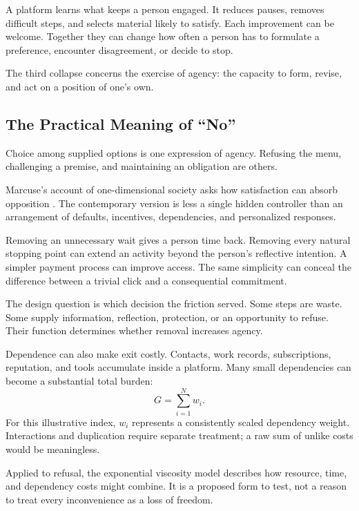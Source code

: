 \documentclass[11pt,openany]{book}
\begin{document}
A platform learns what keeps a person engaged. It reduces pauses, removes difficult steps, and selects material likely to satisfy. Each improvement can be welcome. Together they can change how often a person has to formulate a preference, encounter disagreement, or decide to stop.

The third collapse concerns the exercise of agency: the capacity to form, revise, and act on a position of one's own.

\subsection{The Practical Meaning of “No”}

Choice among supplied options is one expression of agency. Refusing the menu, challenging a premise, and maintaining an obligation are others.

Marcuse's account of one-dimensional society asks how satisfaction can absorb opposition \cite{marcuse1964onedimensional}. The contemporary version is less a single hidden controller than an arrangement of defaults, incentives, dependencies, and personalized responses.

Removing an unnecessary wait gives a person time back. Removing every natural stopping point can extend an activity beyond the person's reflective intention. A simpler payment process can improve access. The same simplicity can conceal the difference between a trivial click and a consequential commitment.

The design question is which decision the friction served. Some steps are waste. Some supply information, reflection, protection, or an opportunity to refuse. Their function determines whether removal increases agency.

Dependence can also make exit costly. Contacts, work records, subscriptions, reputation, and tools accumulate inside a platform. Many small dependencies can become a substantial total burden:
\begin{equation}
 G=\sum_{i=1}^{N}w_i.
\end{equation}
For this illustrative index, $w_i$ represents a consistently scaled dependency weight. Interactions and duplication require separate treatment; a raw sum of unlike costs would be meaningless.

Applied to refusal, the exponential viscosity model describes how resource, time, and dependency costs might combine. It is a proposed form to test, not a reason to treat every inconvenience as a loss of freedom.
\end{document}
